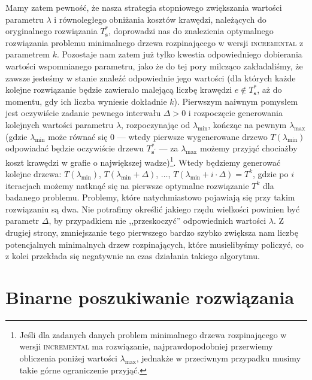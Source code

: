 {Mamy zatem pewność, że nasza strategia stopniowego zwiększania wartości parametru $\lambda$ i równoległego obniżania kosztów krawędzi, należących do oryginalnego rozwiązania $T^{\ast}_{\textbf{s}}$, doprowadzi nas do znalezienia optymalnego rozwiązania problemu minimalnego drzewa rozpinającego w wersji \textsc{incremental} z parametrem $k$. Pozostaje nam zatem już tylko kwestia odpowiedniego dobierania wartości wspomnianego parametru, jako że do tej pory milcząco zakładaliśmy, że zawsze jesteśmy w stanie znaleźć odpowiednie jego wartości (dla których każde kolejne rozwiązanie będzie zawierało malejącą liczbę krawędzi $e \notin T^{\ast}_{\textbf{s}}$, aż do momentu, gdy ich liczba wyniesie dokładnie $k$). Pierwszym naiwnym pomysłem jest oczywiście zadanie pewnego interwału $\Delta > 0$ i rozpoczęcie generowania kolejnych wartości parametru $\lambda$, rozpoczynając od $\lambda_{\text{min}}$, kończąc na pewnym $\lambda_{\text{max}}$ (gdzie $\lambda_{\text{min}}$ może równać się $0$ --- wtedy pierwsze wygenerowane drzewo $T \left( \lambda_{\text{min}} \right)$ odpowiadać będzie oczywiście drzewu $T^{\ast}_{\textbf{s}^{\prime}}$ ---  za $\lambda_{\text{max}}$ możemy przyjąć chociażby koszt krawędzi w grafie o największej wadze)\footnote{Jeśli dla zadanych danych problem minimalnego drzewa rozpinającego w wersji \textsc{incremental} ma rozwiązanie, najprawdopodobniej przerwiemy obliczenia poniżej wartości $\lambda_{\text{max}}$, jednakże w przeciwnym przypadku musimy takie górne ograniczenie przyjąć.}. Wtedy będziemy generować kolejne drzewa: $T \left( \lambda_{\text{min}} \right)$, $T \left( \lambda_{\text{min}} + \Delta \right)$, $\dots$, $T \left( \lambda_{\text{min}} + i \cdot \Delta \right) = T^{k}$, gdzie po $i$ iteracjach możemy natknąć się na pierwsze optymalne rozwiązanie $T^{k}$ dla badanego problemu. Problemy, które natychmiastowo pojawiają się przy takim rozwiązaniu są dwa. Nie potrafimy określić jakiego rzędu wielkości powinien być parametr $\Delta$, by przypadkiem nie ,,przeskoczyć'' odpowiednich wartości $\lambda$. Z drugiej strony, zmniejszanie tego pierwszego bardzo szybko zwiększa nam liczbę potencjalnych minimalnych drzew rozpinających, które musielibyśmy policzyć, co z kolei przekłada się negatywnie na czas działania takiego algorytmu.

\section{Binarne poszukiwanie rozwiązania}

}
